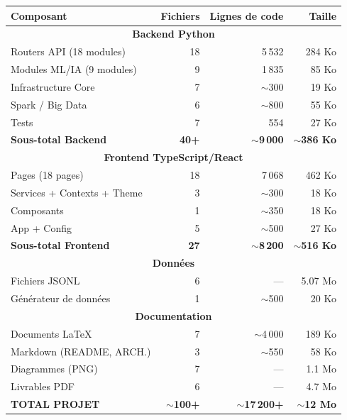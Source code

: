 \documentclass[12pt,a4paper]{article}
\begin{document}
\begin{center}
\renewcommand{\arraystretch}{1.4}
\begin{tabular}{|l|r|r|r|}
\hline
\rowcolor{violet!15}
\textbf{Composant} & \textbf{Fichiers} & \textbf{Lignes de code} & \textbf{Taille} \\
\hline
\multicolumn{4}{|c|}{\cellcolor{grisclair}\textbf{Backend Python}} \\
\hline
Routers API (18 modules) & 18 & 5\,532 & 284 Ko \\
\hline
Modules ML/IA (9 modules) & 9 & 1\,835 & 85 Ko \\
\hline
Infrastructure Core & 7 & $\sim$300 & 19 Ko \\
\hline
Spark / Big Data & 6 & $\sim$800 & 55 Ko \\
\hline
Tests & 7 & 554 & 27 Ko \\
\hline
\rowcolor{grisclair}
\textbf{Sous-total Backend} & \textbf{40+} & \textbf{$\sim$9\,000} & \textbf{$\sim$386 Ko} \\
\hline
\multicolumn{4}{|c|}{\cellcolor{grisclair}\textbf{Frontend TypeScript/React}} \\
\hline
Pages (18 pages) & 18 & 7\,068 & 462 Ko \\
\hline
Services + Contexts + Theme & 3 & $\sim$300 & 18 Ko \\
\hline
Composants & 1 & $\sim$350 & 18 Ko \\
\hline
App + Config & 5 & $\sim$500 & 27 Ko \\
\hline
\rowcolor{grisclair}
\textbf{Sous-total Frontend} & \textbf{27} & \textbf{$\sim$8\,200} & \textbf{$\sim$516 Ko} \\
\hline
\multicolumn{4}{|c|}{\cellcolor{grisclair}\textbf{Données}} \\
\hline
Fichiers JSONL & 6 & --- & 5.07 Mo \\
\hline
Générateur de données & 1 & $\sim$500 & 20 Ko \\
\hline
\multicolumn{4}{|c|}{\cellcolor{grisclair}\textbf{Documentation}} \\
\hline
Documents LaTeX & 7 & $\sim$4\,000 & 189 Ko \\
\hline
Markdown (README, ARCH.) & 3 & $\sim$550 & 58 Ko \\
\hline
Diagrammes (PNG) & 7 & --- & 1.1 Mo \\
\hline
Livrables PDF & 6 & --- & 4.7 Mo \\
\hline
\hline
\rowcolor{bleuclair}
\textbf{TOTAL PROJET} & \textbf{$\sim$100+} & \textbf{$\sim$17\,200+} & \textbf{$\sim$12 Mo} \\
\hline
\end{tabular}
\end{center}
\end{document}
